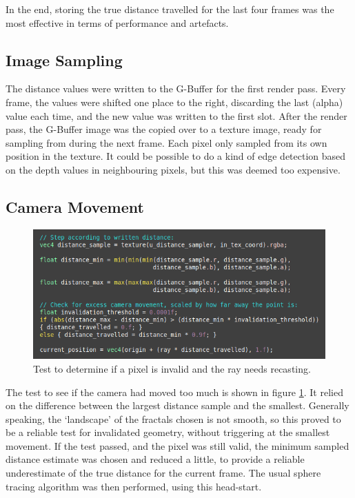 In the end, storing the true distance travelled for the last four frames was the most effective in terms of performance and artefacts.

\subsection{Image Sampling}

The distance values were written to the G-Buffer for the first render pass. Every frame, the values were shifted one place to the right, discarding the last (alpha) value each time, and the new value was written to the first slot. After the render pass, the G-Buffer image was the copied over to a texture image, ready for sampling from during the next frame. Each pixel only sampled from its own position in the texture. It could be possible to do a kind of edge detection based on the depth values in neighbouring pixels, but this was deemed too expensive.

\subsection{Camera Movement}

\begin{figure}[ht]
	\centering
	\includegraphics[width=0.65\linewidth, frame]{Images/Distance-Test.png}
	\caption{Test to determine if a pixel is invalid and the ray needs recasting.}
	\label{figure:distance-test}
\end{figure}

The test to see if the camera had moved too much is shown in figure \ref{figure:distance-test}. It relied on the difference between the largest distance sample and the smallest. Generally speaking, the `landscape' of the fractals chosen is not smooth, so this proved to be a reliable test for invalidated geometry, without triggering at the smallest movement. If the test passed, and the pixel was still valid, the minimum sampled distance estimate was chosen and reduced a little, to provide a reliable underestimate of the true distance for the current frame. The usual sphere tracing algorithm was then performed, using this head-start.


